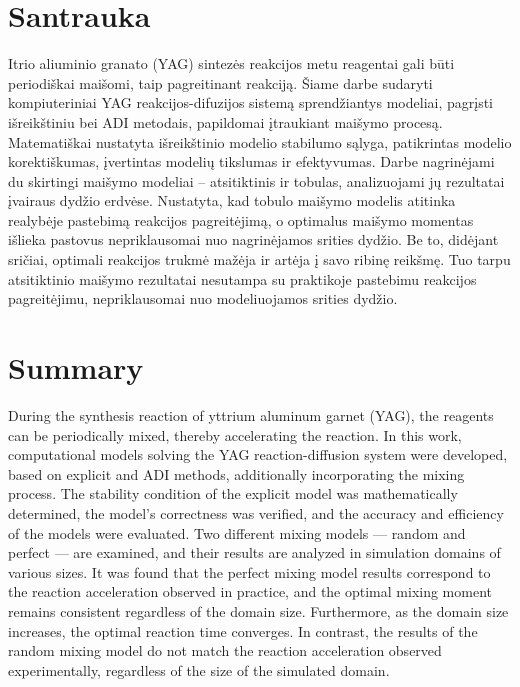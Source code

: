 \section*{Santrauka}

Itrio aliuminio granato (YAG) sintezės reakcijos metu reagentai gali būti periodiškai maišomi, taip pagreitinant reakciją. Šiame darbe sudaryti kompiuteriniai YAG reakcijos-difuzijos sistemą sprendžiantys modeliai, pagrįsti išreikštiniu bei ADI metodais, papildomai įtraukiant maišymo procesą. Matematiškai nustatyta išreikštinio modelio stabilumo sąlyga, patikrintas modelio korektiškumas, įvertintas modelių tikslumas ir efektyvumas. Darbe nagrinėjami du skirtingi maišymo modeliai -- atsitiktinis ir tobulas, analizuojami jų rezultatai įvairaus dydžio erdvėse. Nustatyta, kad tobulo maišymo modelis atitinka realybėje pastebimą reakcijos pagreitėjimą, o optimalus maišymo momentas išlieka pastovus nepriklausomai nuo nagrinėjamos srities dydžio. Be to, didėjant sričiai, optimali reakcijos trukmė mažėja ir artėja į savo ribinę reikšmę. Tuo tarpu atsitiktinio maišymo rezultatai nesutampa su praktikoje pastebimu reakcijos pagreitėjimu, nepriklausomai nuo modeliuojamos srities dydžio.

\newpage 

\section*{Summary}

During the synthesis reaction of yttrium aluminum garnet (YAG), the reagents can be periodically mixed, thereby accelerating the reaction. In this work, computational models solving the YAG reaction-diffusion system were developed, based on explicit and ADI methods, additionally incorporating the mixing process. The stability condition of the explicit model was mathematically determined, the model's correctness was verified, and the accuracy and efficiency of the models were evaluated. Two different mixing models — random and perfect — are examined, and their results are analyzed in simulation domains of various sizes. It was found that the perfect mixing model results correspond to the reaction acceleration observed in practice, and the optimal mixing moment remains consistent regardless of the domain size. Furthermore, as the domain size increases, the optimal reaction time converges. In contrast, the results of the random mixing model do not match the reaction acceleration observed experimentally, regardless of the size of the simulated domain.

\newpage 